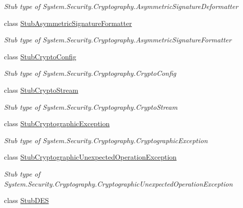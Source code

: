 \begin{DoxyCompactItemize}
\begin{DoxyCompactList}\small\item\em Stub type of System.\-Security.\-Cryptography.\-Asymmetric\-Signature\-Deformatter\end{DoxyCompactList}\item 
class \hyperlink{class_system_1_1_security_1_1_cryptography_1_1_fakes_1_1_stub_asymmetric_signature_formatter}{Stub\-Asymmetric\-Signature\-Formatter}
\begin{DoxyCompactList}\small\item\em Stub type of System.\-Security.\-Cryptography.\-Asymmetric\-Signature\-Formatter\end{DoxyCompactList}\item 
class \hyperlink{class_system_1_1_security_1_1_cryptography_1_1_fakes_1_1_stub_crypto_config}{Stub\-Crypto\-Config}
\begin{DoxyCompactList}\small\item\em Stub type of System.\-Security.\-Cryptography.\-Crypto\-Config\end{DoxyCompactList}\item 
class \hyperlink{class_system_1_1_security_1_1_cryptography_1_1_fakes_1_1_stub_crypto_stream}{Stub\-Crypto\-Stream}
\begin{DoxyCompactList}\small\item\em Stub type of System.\-Security.\-Cryptography.\-Crypto\-Stream\end{DoxyCompactList}\item 
class \hyperlink{class_system_1_1_security_1_1_cryptography_1_1_fakes_1_1_stub_cryptographic_exception}{Stub\-Cryptographic\-Exception}
\begin{DoxyCompactList}\small\item\em Stub type of System.\-Security.\-Cryptography.\-Cryptographic\-Exception\end{DoxyCompactList}\item 
class \hyperlink{class_system_1_1_security_1_1_cryptography_1_1_fakes_1_1_stub_cryptographic_unexpected_operation_exception}{Stub\-Cryptographic\-Unexpected\-Operation\-Exception}
\begin{DoxyCompactList}\small\item\em Stub type of System.\-Security.\-Cryptography.\-Cryptographic\-Unexpected\-Operation\-Exception\end{DoxyCompactList}\item 
class \hyperlink{class_system_1_1_security_1_1_cryptography_1_1_fakes_1_1_stub_d_e_s}{Stub\-D\-E\-S}

\end{DoxyCompactItemize}
